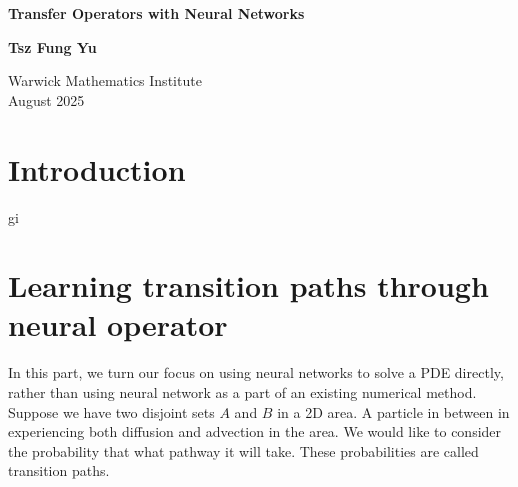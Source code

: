 \documentclass{article}
\begin{document}

\begin{titlepage}
   \begin{center}
       \vspace*{3cm}

        \Large
       \textbf{Transfer Operators with Neural Networks}
            
       \vspace{1.5cm}
       
        \Large
       \textbf{Tsz Fung Yu}

    

       \vfill
            
       
            
       \vspace{0.8cm}
            
       Warwick Mathematics Institute\\
       August 2025
            
   \end{center}
\end{titlepage}
 \newpage
\section{Introduction}
gi


\section{Learning transition paths through neural operator}

In this part, we turn our focus on using neural networks to solve a PDE directly, rather than using neural network as a part of an existing numerical method. \\


Suppose we have two disjoint sets $A$ and $B$ in a 2D area. A particle in between in experiencing both diffusion and advection in the area. We would like to consider the probability that what pathway it will take. These probabilities are called transition paths. \\
\end{document}
